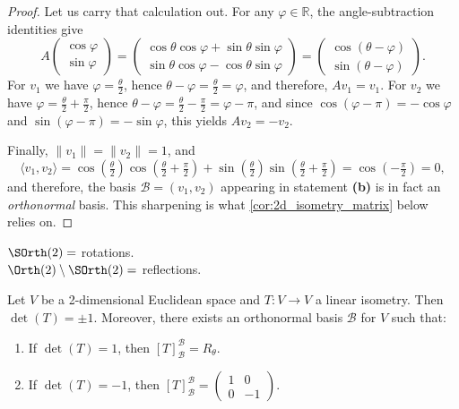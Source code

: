 \begin{proof}
Let us carry that calculation out. For any $\varphi \in \mathbb{R}$, the angle-subtraction identities give
\[
    A \begin{pmatrix} \cos\varphi \\ \sin\varphi \end{pmatrix}
    = \begin{pmatrix} \cos\theta \cos\varphi + \sin\theta \sin\varphi \\ \sin\theta \cos\varphi - \cos\theta \sin\varphi \end{pmatrix}
    = \begin{pmatrix} \cos(\theta - \varphi) \\ \sin(\theta - \varphi) \end{pmatrix}.
\]
For $v_1$ we have $\varphi = \frac{\theta}{2}$, hence $\theta - \varphi = \frac{\theta}{2} = \varphi$, and therefore, $Av_1 = v_1$. For $v_2$ we have $\varphi = \frac{\theta}{2} + \frac{\pi}{2}$, hence $\theta - \varphi = \frac{\theta}{2} - \frac{\pi}{2} = \varphi - \pi$, and since $\cos(\varphi - \pi) = -\cos\varphi$ and $\sin(\varphi - \pi) = -\sin\varphi$, this yields $Av_2 = -v_2$.

Finally, $\|v_1\| = \|v_2\| = 1$, and
\[ \langle v_1, v_2 \rangle = \cos\left(\tfrac{\theta}{2}\right)\cos\left(\tfrac{\theta}{2} + \tfrac{\pi}{2}\right) + \sin\left(\tfrac{\theta}{2}\right)\sin\left(\tfrac{\theta}{2} + \tfrac{\pi}{2}\right) = \cos\left(-\tfrac{\pi}{2}\right) = 0, \]
and therefore, the basis $\mathcal{B} = (v_1, v_2)$ appearing in statement \textbf{(b)} is in fact an \emph{orthonormal} basis. This sharpening is what \cref{cor:2d_isometry_matrix} below relies on.
\end{proof}

\begin{summary}
$\SOrth(2) =$ rotations. \\
$\Orth(2) \setminus \SOrth(2) =$ reflections.
\end{summary}

\begin{corollary}
\label{cor:2d_isometry_matrix}
Let $V$ be a 2-di\-men\-sional Euclidean space and $T \colon V \to V$ a linear isometry. Then $\det(T) = \pm 1$. 
Moreover, there exists an orthonormal basis $\mathcal{B}$ for $V$ such that:
\begin{enumerate}
    \item If $\det(T) = 1$, then $[T]_{\mathcal{B}}^{\mathcal{B}} = R_\theta$.
    \item If $\det(T) = -1$, then $[T]_{\mathcal{B}}^{\mathcal{B}} = \left(\begin{smallmatrix} 1 & 0 \\ 0 & -1 \end{smallmatrix}\right)$.
\end{enumerate}
\end{corollary}

